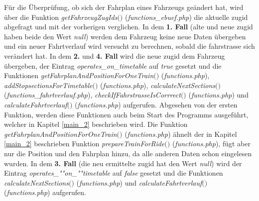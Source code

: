 Für die Überprüfung, ob sich der Fahrplan eines Fahrzeugs geändert hat, wird über die Funktion \textit{getFahrzeugZugIds$($$)$} (\textit{func\-tions\_ebuef.php}) die aktuelle \Gls{zugid} abgefragt und mit der vorherigen verglichen. In dem \textbf{1. Fall} (alte und neue \Gls{zugid} haben beide den Wert \textit{null}) werden dem Fahrzeug keine neue Daten übergeben und ein neuer Fahrtverlauf wird versucht zu berechnen, sobald die \Gls{fahrstrasse} sich verändert hat. In dem \textbf{2.} und \textbf{4. Fall} wird die neue \Gls{zugid} dem Fahrzeug übergeben, der Eintrag \textit{operates\_on\_time\-table} auf \textit{true} gesetzt und die Funktionen \textit{get\-Fahr\-plan\-And\-Po\-sition\-For\-One\-Train$($$)$} (\textit{func\-tions.php}), \textit{add\-Stop\-sections\-For\-Time\-table$($$)$} (\textit{func\-tions.php}), \textit{calculate\-Next\-Sec\-tions$($$)$} (\textit{func\-tions\_fahrtverlauf.php}), \textit{check\-If\-Fahrstrasse\-Is\-Corrrect$($$)$} (\textit{func\-tions.php}) und \textit{calculate\-Fahrt\-ver\-lauf$($$)$} (\textit{func\-tions\-.php}) aufgerufen. Abgesehen von der ersten Funktion, werden diese Funktionen auch beim Start des Programms ausgeführt, welcher in Kapitel \ref{main_2} beschrieben wird. Die Funktion \textit{get\-Fahrplan\-And\-Position\-For\-One\-Train$($$)$} (\textit{func\-tions.php}) ähnelt der in Kapitel \ref{main_2} beschrieben Funktion \textit{pre\-pare\-Train\-For\-Ride$($$)$} (\textit{func\-tions.php}), fügt aber nur die Position und den Fahrplan hinzu, da alle anderen Daten schon eingelesen wurden. In dem \textbf{3. Fall} (die neu ermittelte \Gls{zugid} hat den Wert \textit{null}) wird der Eintrag \textit{ope\-rates\_""on\_""time\-table} auf \textit{false} gesetzt und die Funktionen \textit{cal\-cu\-late\-Next\-Sec\-tions$($$)$} (\textit{func\-tions.php}) und \textit{cal\-cu\-late\-Fahrt\-ver\-lauf$($$)$} (\textit{func\-tions.php}) aufgerufen.

